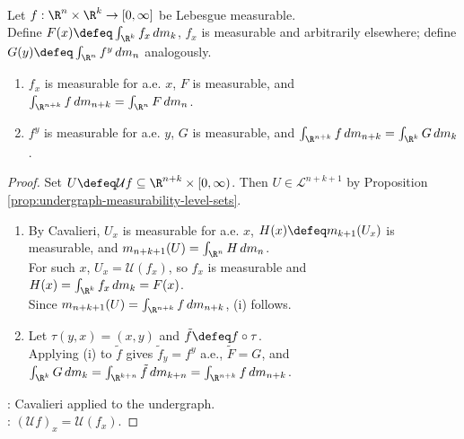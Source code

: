 \begin{theorem} \label{thm:fubini-tonelli-nonnegative-euclidean} \\
Let $f:\R^n\times\R^k\to[0,\infty]$ be Lebesgue measurable.\\
Define $F(x)\defeq\int_{\R^k}f_x\,dm_k$, $f_x$ is measurable and arbitrarily elsewhere; define $G(y)\defeq\int_{\R^n}f^y\,dm_n$ analogously.
\begin{enumerate}[label=(\roman*)]
\setlength{\itemsep}{0pt}
\item $f_x$ is measurable for a.e. $x$, $F$ is measurable, and $\int_{\R^{n+k}}f\,dm_{n+k}=\int_{\R^n}F\,dm_n$.
\item $f^y$ is measurable for a.e. $y$, $G$ is measurable, and $\int_{\R^{n+k}}f\,dm_{n+k}=\int_{\R^k}G\,dm_k$.
\end{enumerate}
\begin{proof}
Set $U\defeq\mathcal{U}f\subseteq\R^{n+k}\times[0,\infty)$. Then $U\in\mathcal{L}^{n+k+1}$ by Proposition \ref{prop:undergraph-measurability-level-sets}.
\begin{enumerate}[label=(\roman*)]
\setlength{\itemsep}{0pt}
\item By Cavalieri, $U_x$ is measurable for a.e. $x$, $H(x)\defeq m_{k+1}(U_x)$ is measurable, and $m_{n+k+1}(U)=\int_{\R^n}H\,dm_n$.\\
For such $x$, $U_x=\mathcal{U}(f_x)$, so $f_x$ is measurable and $H(x)=\int_{\R^k}f_x\,dm_k=F(x)$.\\
Since $m_{n+k+1}(U)=\int_{\R^{n+k}}f\,dm_{n+k}$, (i) follows.
\item Let $\tau(y,x)=(x,y)$ and $\tilde f\defeq f\circ\tau$.\\
Applying (i) to $\tilde f$ gives $\tilde f_y=f^y$ a.e., $\tilde F=G$, and $\int_{\R^k}G\,dm_k=\int_{\R^{k+n}}\tilde f\,dm_{k+n}=\int_{\R^{n+k}}f\,dm_{n+k}$.
\end{enumerate}
: Cavalieri applied to the undergraph.\\
: $(\mathcal{U}f)_x=\mathcal{U}(f_x)$.
\end{proof}
\end{theorem}

